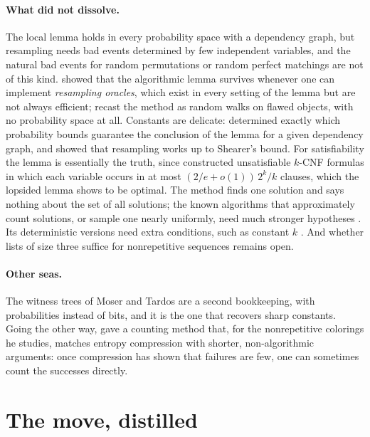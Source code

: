 \begin{refsection}
\paragraph{What did not dissolve.} The local lemma holds in every probability space with a dependency graph, but resampling needs bad events determined by few independent variables, and the natural bad events for random permutations or random perfect matchings are not of this kind. \Textcite{HarveyVondrak2015} showed that the algorithmic lemma survives whenever one can implement \emph{resampling oracles}, which exist in every setting of the lemma but are not always efficient; \textcite{AchlioptasIliopoulos2016} recast the method as random walks on flawed objects, with no probability space at all. Constants are delicate: \textcite{Shearer1985} determined exactly which probability bounds guarantee the conclusion of the lemma for a given dependency graph, and \textcite{KolipakaSzegedy2011} showed that resampling works up to Shearer's bound. For satisfiability the lemma is essentially the truth, since \textcite{GebauerSzaboTardos2016} constructed unsatisfiable $k$-CNF formulas in which each variable occurs in at most $(2/e+o(1))\,2^k/k$ clauses, which the lopsided lemma shows to be optimal. The method finds one solution and says nothing about the set of all solutions; the known algorithms that approximately count solutions, or sample one nearly uniformly, need much stronger hypotheses \parencite{Moitra2019}. Its deterministic versions need extra conditions, such as constant $k$ \parencite{Moser2009,MoserTardos2010}. And whether lists of size three suffice for nonrepetitive sequences remains open.

\paragraph{Other seas.} The witness trees of Moser and Tardos are a second bookkeeping, with probabilities instead of bits, and it is the one that recovers sharp constants. Going the other way, \textcite{Rosenfeld2020} gave a counting method that, for the nonrepetitive colorings he studies, matches entropy compression with shorter, non-algorithmic arguments: once compression has shown that failures are few, one can sometimes count the successes directly.

\section{The move, distilled}\label{sec:compression:distilled}


\end{refsection}
